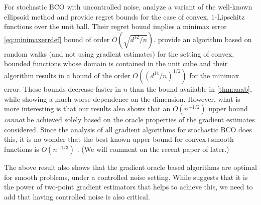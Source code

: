 For stochastic BCO with uncontrolled noise, \citet{AgFoHsuKaRa13:SIAM} analyze a variant of the well-known ellipsoid method and provide regret bounds for the case of convex, $1$-Lipschitz functions over the unit ball. 
Their regret bound implies a minimax error \eqref{eq:minimaxerrdef} bound of order  $O\left(\sqrt{d^{32}/n}\right)$. 
\citet{liang2014zeroth} provide an algorithm based on random walks (and not using gradient estimates) for the setting of convex, bounded functions whose domain is contained in the unit cube and their algorithm results in a bound of the order $O\left((d^{14}/n)^{1/2}\right)$ for the minimax error.
These bounds decrease faster in $n$ than the bound available in \cref{thm:aaab}, while showing a much worse dependence on the dimension.
However, what is more interesting is that our results also shows that an $O(n^{-1/2})$ upper bound \emph{cannot} be achieved solely based on the oracle properties of the gradient estimates considered. Since the analysis of all gradient algorithms for stochastic BCO does this, it is no wonder that the best known upper bound for convex+smooth functions is $O(n^{-1/3})$ \citep{saha2011improved}. (We will comment on the recent paper of \citealt{DeElKo15} later.)

The above result also shows that the gradient oracle based algorithms are optimal for smooth problems, under a controlled noise setting.
While \citet{duchi2015optimal} suggests that it is the power of two-point gradient estimators that helps to achieve this, we need to add that having controlled noise is also critical. %

